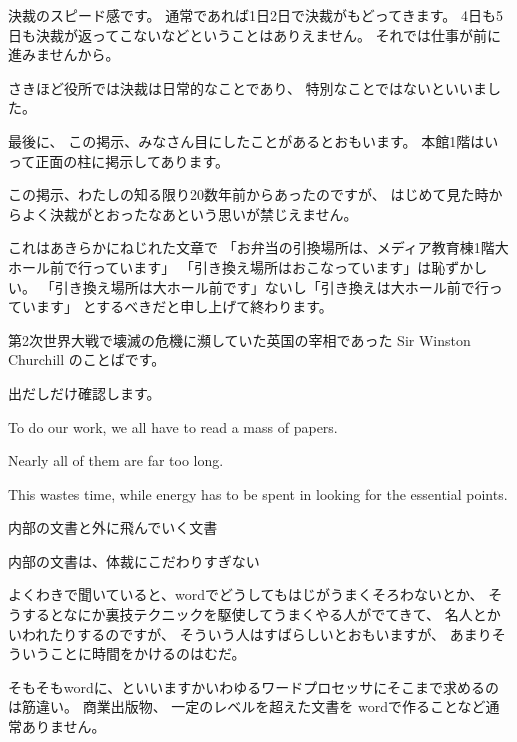 \documentclass[uplatex,jis2004,dvipdfmx,12pt]{jsarticle}
\begin{document}
決裁のスピード感です。
通常であれば1日2日で決裁がもどってきます。
4日も5日も決裁が返ってこないなどということはありえません。
それでは仕事が前に進みませんから。





さきほど役所では決裁は日常的なことであり、
特別なことではないといいました。



最後に、
この掲示、みなさん目にしたことがあるとおもいます。
本館1階はいって正面の柱に掲示してあります。

この掲示、わたしの知る限り20数年前からあったのですが、
はじめて見た時からよく決裁がとおったなあという思いが禁じえません。

これはあきらかにねじれた文章で
「お弁当の引換場所は、メディア教育棟1階大ホール前で行っています」
「引き換え場所はおこなっています」は恥ずかしい。
「引き換え場所は大ホール前です」ないし「引き換えは大ホール前で行っています」
とするべきだと申し上げて終わります。



第2次世界大戦で壊滅の危機に瀕していた英国の宰相であった Sir Winston Churchill
のことばです。


出だしだけ確認します。

To do our work, we all have to read a mass of papers.

 Nearly all of them are far too long.

 This wastes time, while energy has to be spent in looking for the essential points.



内部の文書と外に飛んでいく文書

内部の文書は、体裁にこだわりすぎない

よくわきで聞いていると、wordでどうしてもはじがうまくそろわないとか、
そうするとなにか裏技テクニックを駆使してうまくやる人がでてきて、
名人とかいわれたりするのですが、
そういう人はすばらしいとおもいますが、
あまりそういうことに時間をかけるのはむだ。

そもそもwordに、といいますかいわゆるワードプロセッサにそこまで求めるのは筋違い。
商業出版物、
一定のレベルを超えた文書を
wordで作ることなど通常ありません。

\end{document}
